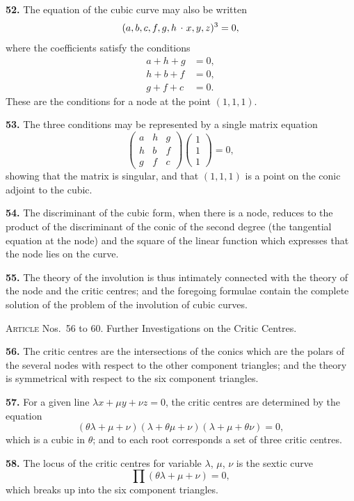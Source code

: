 \documentclass[11pt,a4paper]{article}
\theoremstyle{plain}
\theoremstyle{definition}
\newcommand{\lc}{\kern.17em\raise.5ex\hbox{.}\kern.08em}  %
\begin{document}
\textbf{52.} The equation of the cubic curve may also be written
\[
(a, b, c, f, g, h \mathbin{\lc} x, y, z)^3 = 0,
\]
where the coefficients satisfy the conditions
\begin{align*}
a + h + g &= 0, \\
h + b + f &= 0, \\
g + f + c &= 0.
\end{align*}
These are the conditions for a node at the point $(1, 1, 1)$.

\textbf{53.} The three conditions may be represented by a single matrix equation
\[
\begin{pmatrix} a & h & g \\ h & b & f \\ g & f & c \end{pmatrix}
\begin{pmatrix} 1 \\ 1 \\ 1 \end{pmatrix} = 0,
\]
showing that the matrix is singular, and that $(1, 1, 1)$ is a point on the conic adjoint to the cubic.

\textbf{54.} The discriminant of the cubic form, when there is a node, reduces to the product of the discriminant of the conic of the second degree (the tangential equation at the node) and the square of the linear function which expresses that the node lies on the curve.

\textbf{55.} The theory of the involution is thus intimately connected with the theory of the node and the critic centres; and the foregoing formulae contain the complete solution of the problem of the involution of cubic curves.

\bigskip

\noindent\textsc{Article} Nos.~56 to 60.  Further Investigations on the Critic Centres.

\medskip

\textbf{56.} The critic centres are the intersections of the conics which are the polars of the several nodes with respect to the other component triangles; and the theory is symmetrical with respect to the six component triangles.

\textbf{57.} For a given line $\lambda x + \mu y + \nu z = 0$, the critic centres are determined by the equation
\[
(\theta\lambda + \mu + \nu)(\lambda + \theta\mu + \nu)(\lambda + \mu + \theta\nu) = 0,
\]
which is a cubic in $\theta$; and to each root corresponds a set of three critic centres.

\textbf{58.} The locus of the critic centres for variable $\lambda$, $\mu$, $\nu$ is the sextic curve
\[
\prod(\theta\lambda + \mu + \nu) = 0,
\]
which breaks up into the six component triangles.
\end{document}
